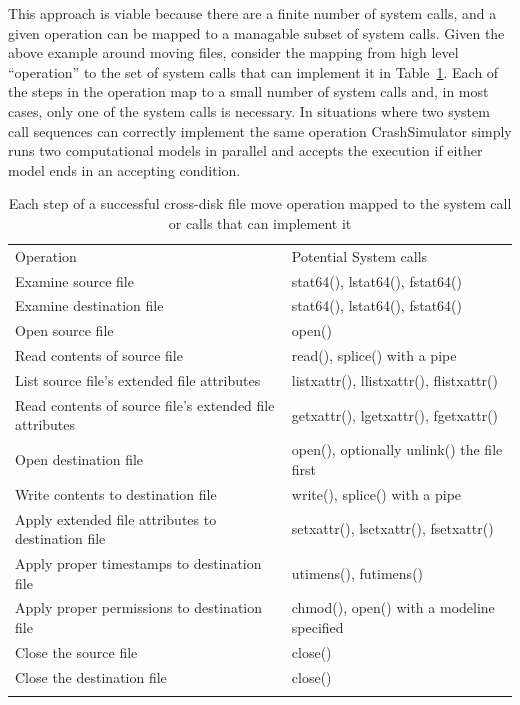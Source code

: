 This approach is viable because there are a finite number of system calls, and a
given operation can be mapped to a managable subset of system calls.  Given the
above example around moving files, consider the mapping from high level
``operation'' to the set of system calls that can implement it in
Table~\ref{table:stepsandcalls}.  Each of the steps in the operation map to a small
number of system calls and, in most cases, only one of the system calls is
necessary.  In situations where two system call sequences can correctly
implement the same operation CrashSimulator simply runs two computational models
in parallel and accepts the execution if either model ends in an accepting
condition.

\begin{table}[t]
    \scriptsize{}
    \begin{tabular}{l | l }
    \toprule{}
      Operation                                               & Potential System calls\\
      Examine source file                                     & stat64(), lstat64(), fstat64()\\
      Examine destination file                                & stat64(), lstat64(), fstat64()\\
      Open source file                                        & open()\\
      Read contents of source file                            & read(), splice() with a pipe\\
      List source file's extended file attributes             & listxattr(), llistxattr(), flistxattr()\\
      Read contents of source file's extended file attributes & getxattr(), lgetxattr(), fgetxattr()\\
      Open destination file                                   & open(), optionally unlink() the file first\\
      Write contents to destination file                      & write(), splice() with a pipe\\
      Apply extended file attributes to destination file      & setxattr(), lsetxattr(), fsetxattr()\\
      Apply proper timestamps to destination file             & utimens(), futimens()\\
      Apply proper permissions to destination file            & chmod(), open() with a modeline specified\\
      Close the source file                                   & close()\\
      Close the destination file                              & close()\\
    \bottomrule{}
    \end{tabular}
    \caption{Each step of a successful cross-disk file move operation mapped to
      the system call or calls that can implement it}
    \label{table:stepsandcalls}
\end{table}
    
